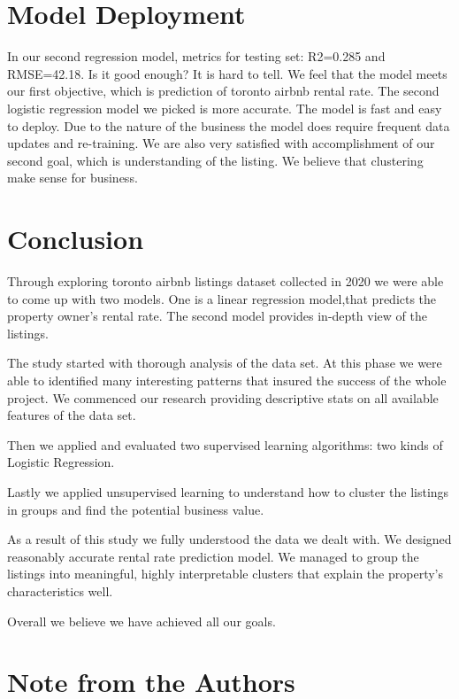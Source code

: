 \hypertarget{model-deployment}{%
\section{Model Deployment}\label{model-deployment}}

In our second regression model, metrics for testing set: R2=0.285 and
RMSE=42.18. Is it good enough? It is hard to tell. We feel that the
model meets our first objective, which is prediction of toronto airbnb
rental rate. The second logistic regression model we picked is more
accurate. The model is fast and easy to deploy. Due to the nature of the
business the model does require frequent data updates and re-training.
We are also very satisfied with accomplishment of our second goal, which
is understanding of the listing. We believe that clustering make sense
for business.

\hypertarget{conclusion}{%
\section{Conclusion}\label{conclusion}}

Through exploring toronto airbnb listings dataset collected in 2020 we
were able to come up with two models. One is a linear regression
model,that predicts the property owner's rental rate. The second model
provides in-depth view of the listings.

The study started with thorough analysis of the data set. At this phase
we were able to identified many interesting patterns that insured the
success of the whole project. We commenced our research providing
descriptive stats on all available features of the data set.

Then we applied and evaluated two supervised learning algorithms: two
kinds of Logistic Regression.

Lastly we applied unsupervised learning to understand how to cluster the
listings in groups and find the potential business value.

As a result of this study we fully understood the data we dealt with. We
designed reasonably accurate rental rate prediction model. We managed to
group the listings into meaningful, highly interpretable clusters that
explain the property's characteristics well.

Overall we believe we have achieved all our goals.



\hypertarget{note-from-the-authors}{%
\section{Note from the Authors}\label{note-from-the-authors}}

